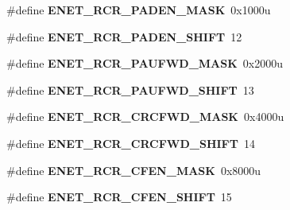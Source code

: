 \begin{DoxyCompactItemize}
\item 
\#define {\bfseries E\+N\+E\+T\+\_\+\+R\+C\+R\+\_\+\+P\+A\+D\+E\+N\+\_\+\+M\+A\+SK}~0x1000u\hypertarget{group__ENET__Register__Masks_gab6a8c4abb6a9bd525324ca790a9255bf}{}\label{group__ENET__Register__Masks_gab6a8c4abb6a9bd525324ca790a9255bf}

\item 
\#define {\bfseries E\+N\+E\+T\+\_\+\+R\+C\+R\+\_\+\+P\+A\+D\+E\+N\+\_\+\+S\+H\+I\+FT}~12\hypertarget{group__ENET__Register__Masks_ga0aa5cc8815e76a8054a4dc13c5006118}{}\label{group__ENET__Register__Masks_ga0aa5cc8815e76a8054a4dc13c5006118}

\item 
\#define {\bfseries E\+N\+E\+T\+\_\+\+R\+C\+R\+\_\+\+P\+A\+U\+F\+W\+D\+\_\+\+M\+A\+SK}~0x2000u\hypertarget{group__ENET__Register__Masks_ga664fa2802383748f83527ad422cede34}{}\label{group__ENET__Register__Masks_ga664fa2802383748f83527ad422cede34}

\item 
\#define {\bfseries E\+N\+E\+T\+\_\+\+R\+C\+R\+\_\+\+P\+A\+U\+F\+W\+D\+\_\+\+S\+H\+I\+FT}~13\hypertarget{group__ENET__Register__Masks_gace2ee9a69ab345416d6f15835b49f689}{}\label{group__ENET__Register__Masks_gace2ee9a69ab345416d6f15835b49f689}

\item 
\#define {\bfseries E\+N\+E\+T\+\_\+\+R\+C\+R\+\_\+\+C\+R\+C\+F\+W\+D\+\_\+\+M\+A\+SK}~0x4000u\hypertarget{group__ENET__Register__Masks_gab00e088ecf7a8439af6dfc86951e65a9}{}\label{group__ENET__Register__Masks_gab00e088ecf7a8439af6dfc86951e65a9}

\item 
\#define {\bfseries E\+N\+E\+T\+\_\+\+R\+C\+R\+\_\+\+C\+R\+C\+F\+W\+D\+\_\+\+S\+H\+I\+FT}~14\hypertarget{group__ENET__Register__Masks_gacc33ea25694cc26264d3bec46a69fa2d}{}\label{group__ENET__Register__Masks_gacc33ea25694cc26264d3bec46a69fa2d}

\item 
\#define {\bfseries E\+N\+E\+T\+\_\+\+R\+C\+R\+\_\+\+C\+F\+E\+N\+\_\+\+M\+A\+SK}~0x8000u\hypertarget{group__ENET__Register__Masks_ga37304dd0d74e9be8367adad2e57ce358}{}\label{group__ENET__Register__Masks_ga37304dd0d74e9be8367adad2e57ce358}

\item 
\#define {\bfseries E\+N\+E\+T\+\_\+\+R\+C\+R\+\_\+\+C\+F\+E\+N\+\_\+\+S\+H\+I\+FT}~15\hypertarget{group__ENET__Register__Masks_ga01c9e6e46880a41e6219729598048b1e}{}\label{group__ENET__Register__Masks_ga01c9e6e46880a41e6219729598048b1e}


\end{DoxyCompactItemize}
